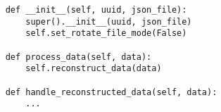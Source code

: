 \begin{lstlisting}
    def __init__(self, uuid, json_file):
        super().__init__(uuid, json_file)
        self.set_rotate_file_mode(False)

    def process_data(self, data):
        self.reconstruct_data(data)

    def handle_reconstructed_data(self, data):
        ...
\end{lstlisting}